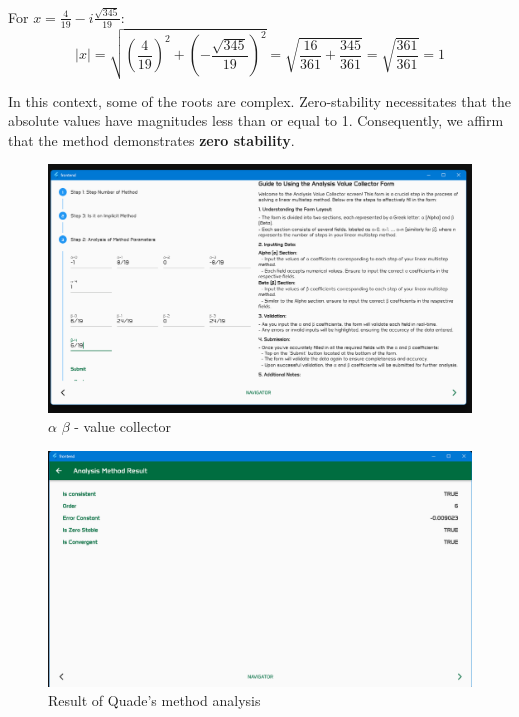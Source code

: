 \documentclass[a4paper, twoside]{report} %
\begin{document}
	For \( x = \frac{4}{19} - i\frac{\sqrt{345}}{19} \):
	\[
	|x| = \sqrt{\left(\frac{4}{19}\right)^2 + \left(-\frac{\sqrt{345}}{19}\right)^2} = \sqrt{\frac{16}{361} + \frac{345}{361}} = \sqrt{\frac{361}{361}} = 1
	\]

	In this context, some of the roots are complex. Zero-stability necessitates that the absolute values have magnitudes less than or equal to 1. Consequently, we affirm that the method demonstrates \textbf{zero stability}.



	\begin{figure}[htbp]
		\centering
		\includegraphics[width=1\textwidth]{chapters/4/image/1.png}
		\caption{$\alpha$ $\beta$ - value collector}
	\end{figure}

	\begin{figure}[htbp]
		\centering
		\includegraphics[width=1\textwidth]{chapters/4/image/2.png}
		\caption{Result of Quade's method analysis}
	\end{figure}

	\newpage
\end{document}
